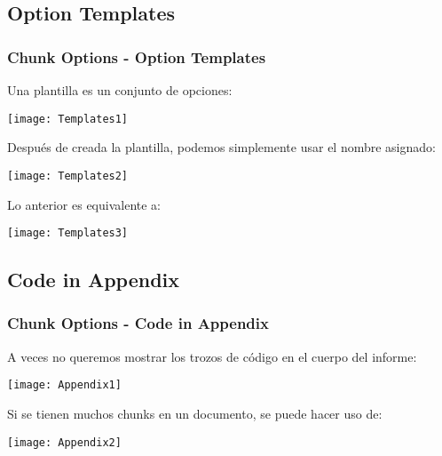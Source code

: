 \documentclass[11pt]{beamer}					%
\begin{document}
	\subsection{Option Templates}
		\begin{frame}
			\frametitle{Chunk Options - Option Templates}
				\begin{block}{Una plantilla es un conjunto de opciones:}
					\begin{small}
						\begin{center}
						\texttt{[image: Templates1]} 
						\end{center}
					\end{small}
				\end{block}
				\begin{block}{Después de creada la plantilla, podemos simplemente usar el nombre asignado:}
					\begin{small}
						\begin{center}
						\texttt{[image: Templates2]} 
						\end{center}
					\end{small}
				\end{block}
				\begin{block}{Lo anterior es equivalente a:}
					\begin{small}
						\begin{center}
						\texttt{[image: Templates3]} 
						\end{center}
					\end{small}
				\end{block}
		\end{frame}
	\subsection{Code in Appendix}
		\begin{frame}
			\frametitle{Chunk Options - Code in Appendix}
				\begin{block}{A veces no queremos mostrar los trozos de código en el cuerpo del informe:}
					\begin{small}
						\begin{center}
						\texttt{[image: Appendix1]} 
						\end{center}
					\end{small}
				\end{block}
				\begin{block}{Si se tienen muchos chunks en un documento, se puede hacer uso de:}
					\begin{small}
						\begin{center}
						\texttt{[image: Appendix2]} 
						\end{center}
					\end{small}
				\end{block}
		\end{frame}
\end{document}
